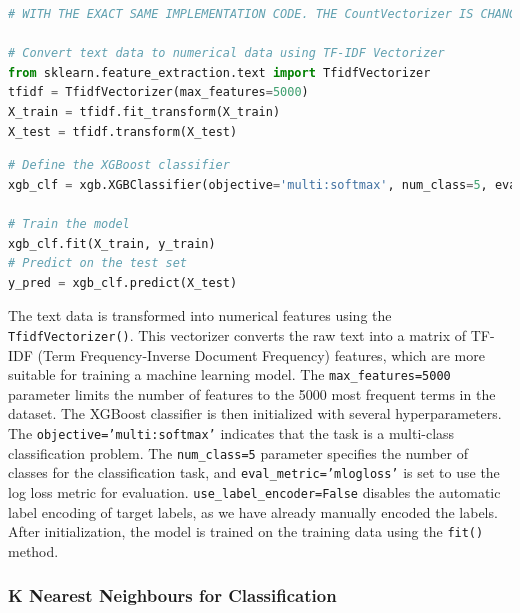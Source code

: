 \begin{tcolorbox}[colback=gray!5!white, colframe=gray!80!black, boxrule=0.5pt, title=XGBoost Classifier Implementation]
    \begin{lstlisting}[language=Python]
# WITH THE EXACT SAME IMPLEMENTATION CODE. THE CountVectorizer IS CHANGED TO TF-IDF

# Convert text data to numerical data using TF-IDF Vectorizer
from sklearn.feature_extraction.text import TfidfVectorizer
tfidf = TfidfVectorizer(max_features=5000)
X_train = tfidf.fit_transform(X_train)
X_test = tfidf.transform(X_test)
\end{lstlisting}
\end{tcolorbox}
\begin{tcolorbox}[colback=gray!5!white, colframe=gray!80!black, boxrule=0.5pt, title=XGBoost Classifier Implementation]
    \begin{lstlisting}[language=Python]
# Define the XGBoost classifier
xgb_clf = xgb.XGBClassifier(objective='multi:softmax', num_class=5, eval_metric='mlogloss', use_label_encoder=False)

# Train the model
xgb_clf.fit(X_train, y_train)
# Predict on the test set
y_pred = xgb_clf.predict(X_test)
\end{lstlisting}
\end{tcolorbox}

\noindent
The text data is transformed into numerical features using the \texttt{TfidfVectorizer()}. This vectorizer converts the raw text into a matrix of TF-IDF (Term Frequency-Inverse Document Frequency) features, which are more suitable for training a machine learning model. The \texttt{max\_features=5000} parameter limits the number of features to the 5000 most frequent terms in the dataset. The XGBoost classifier is then initialized with several hyperparameters. The \texttt{objective='multi:softmax'} indicates that the task is a multi-class classification problem. The \texttt{num\_class=5} parameter specifies the number of classes for the classification task, and \texttt{eval\_metric='mlogloss'} is set to use the log loss metric for evaluation. \texttt{use\_label\_encoder=False} disables the automatic label encoding of target labels, as we have already manually encoded the labels. After initialization, the model is trained on the training data using the \texttt{fit()} method. 


\subsubsection{K Nearest Neighbours for Classification}

